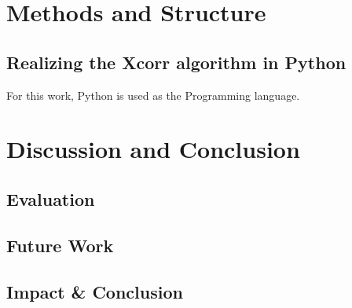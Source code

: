 \documentclass[12pt]{article}
\begin{document}
\section{Methods and Structure}
\subsection{Realizing the Xcorr algorithm in Python}
For this work, Python is used as the Programming language. 

\section{Discussion and Conclusion}
\subsection{Evaluation}
\subsection{Future Work}
\subsection{Impact \& Conclusion}


\printbibliography
\end{document}
